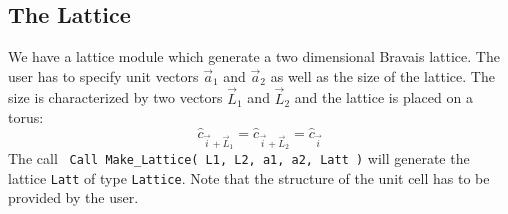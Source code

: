 



\subsection{The Lattice}

We have a lattice module  which  generate  a two dimensional Bravais lattice.  The user has to specify unit vectors $\vec{a}_1$ and $\vec{a}_2$ as well as   the size of the  lattice. The size is  characterized by  two vectors $\vec{L}_1$ and $\vec{L}_2$   and  the lattice is placed on a torus: 
\begin{equation}
	\hat{c}_{\vec{i} + \vec{L}_1 }  = \hat{c}_{\vec{i} + \vec{L}_2 }  = \hat{c}_{\vec{i}}
\end{equation}
The call 
\texttt{ Call Make\_Lattice( L1, L2, a1,  a2, Latt )} will generate the lattice   \texttt{Latt} of type \texttt{Lattice}.   Note that  the structure of the unit cell has to be provided by the user. 
 


